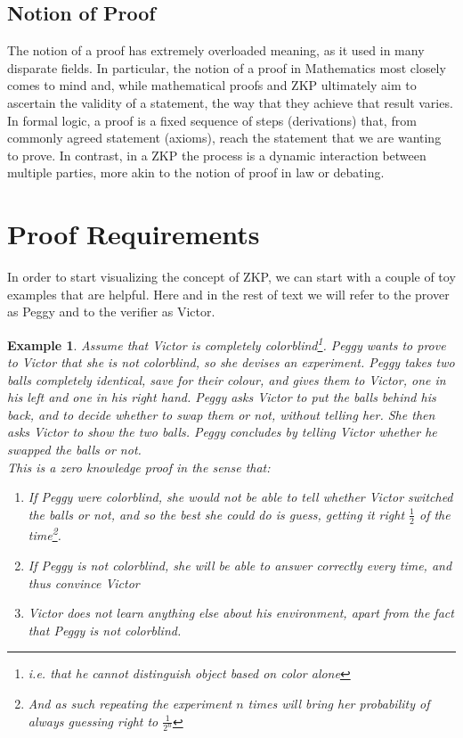 \documentclass{article}
\newtheorem{example}{Example}
\begin{document}
\subsection{Notion of Proof}
The notion of a proof has extremely overloaded meaning, as it used in many disparate fields. In particular, the notion of a proof in Mathematics most closely comes to mind and, while mathematical proofs and ZKP ultimately aim to ascertain the validity of a statement, the way that they achieve that result varies. In formal logic, a proof is a fixed sequence of steps (derivations) that, from commonly agreed statement (axioms), reach the statement that we are wanting to prove. In contrast, in a ZKP the process is a dynamic interaction between multiple parties, more akin to the notion of proof in law or debating.

\section{Proof Requirements}
\label{proofreq}
In order to start visualizing the concept of ZKP, we can start with a couple of toy examples that are helpful. Here and in the rest of text we will refer to the prover as Peggy and to the verifier as Victor.
\begin{example}
    Assume that Victor is completely colorblind\footnote{i.e. that he cannot distinguish object based on color alone}.
    Peggy wants to prove to Victor that she is not colorblind, so she devises an experiment.
    Peggy takes two balls completely identical, save for their colour, and gives them to Victor, one in his left and one in his right hand.
    Peggy asks Victor to put the balls behind his back, and to decide whether to swap them or not, without telling her.
    She then asks Victor to show the two balls.
    Peggy concludes by telling Victor whether he swapped the balls or not.\\
    This is a zero knowledge proof in the sense that:
    \begin{enumerate}
        \item If Peggy were colorblind, she would not be able to tell whether Victor switched the balls or not, and so the best she could do is guess, getting it right $\frac{1}{2}$ of the time\footnote{And as such repeating the experiment $n$ times will bring her probability of always guessing right to $\frac{1}{2^n}$}.
        \item If Peggy is not colorblind, she will be able to answer correctly every time, and thus convince Victor
        \item Victor does not learn anything else about his environment, apart from the fact that Peggy is not colorblind.
    \end{enumerate}
\end{example}
\end{document}
